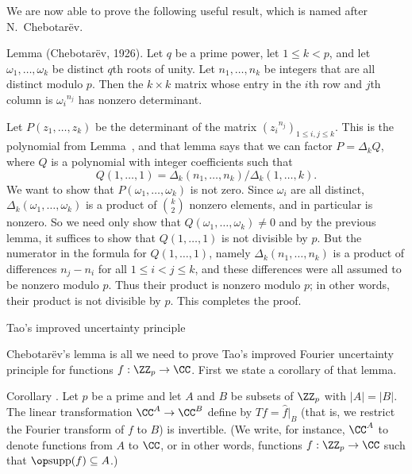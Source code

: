 We are now able to prove the following useful result, which is named after N.~Chebotar\"ev.

\parenproclaim Lemma {\advthm} (Chebotar\"ev, {\rm 1926}). Let $q$ be a prime power, let $1\le k<p$,
and let $\omega_1,\ldots,\omega_k$ be distinct $q$th roots of unity. Let $n_1,\ldots,n_k$
be integers that are all distinct modulo $p$. Then the $k\times k$ matrix whose entry in the $i$th
row and $j$th column is ${\omega_i}^{n_j}$ has nonzero determinant.

\proof Let $P(z_1,\ldots,z_k)$ be the determinant of the matrix $({z_i}^{n_j})_{1\le i,j\le k}$. This
is the polynomial from Lemma~{\the\vandermonde}, and that lemma says that we can factor
$P = \Delta_k Q$, where $Q$ is a polynomial with integer coefficients such that
$$Q(1,\ldots,1) = \Delta_k(n_1,\ldots,n_k)/\Delta_k(1,\ldots,k).$$
We want to show that $P(\omega_1,\ldots,\omega_k)$ is not zero. Since
$\omega_i$ are all distinct, $\Delta_k(\omega_1,\ldots,\omega_k)$ is a product of ${k\choose 2}$
nonzero elements, and in particular is nonzero. So we need only show that $Q(\omega_1,\ldots,\omega_k)\ne 0$
and by the previous lemma, it suffices to show that $Q(1,\ldots,1)$ is not divisible by $p$.
But the numerator in the formula for $Q(1,\ldots,1)$, namely $\Delta_k(n_1,\ldots,n_k)$ is a product
of differences $n_j-n_i$ for all $1\le i<j\le k$, and these differences were all assumed to be nonzero
modulo $p$. Thus their product is nonzero modulo $p$; in other words, their product is not divisible by $p$.
This completes the proof.\slug

\advsect Tao's improved uncertainty principle

Chebotar\"ev's lemma is all we need to prove Tao's improved Fourier uncertainty principle for
functions $f:\ZZ_p\to \CC$. First we state a corollary of that lemma.

\proclaim Corollary \advthm. Let $p$ be a prime and let $A$ and $B$ be subsets of $\ZZ_p$
with $|A| = |B|$. The linear transformation $\CC^A\to \CC^B$ define by $T f = \hat f|_B$ (that is,
we restrict the Fourier transform of $f$ to $B$) is invertible. (We write, for instance, $\CC^A$
to denote functions from $A$ to $\CC$, or in other words, functions $f:\ZZ_p\to \CC$ such that
$\supp(f)\subseteq A$.)

